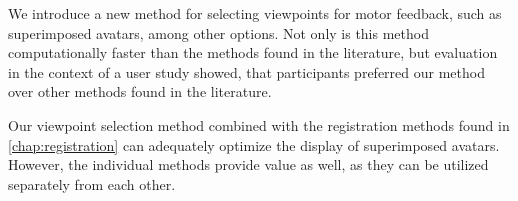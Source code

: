 We introduce a new method for selecting viewpoints for motor feedback, such as superimposed avatars, among other options. Not only is this method computationally faster than the methods found in the literature, but evaluation in the context of a user study showed, that participants preferred our method over other methods found in the literature.

Our viewpoint selection method combined with the registration methods found in \autoref{chap:registration} can adequately optimize the display of superimposed avatars. However, the individual methods provide value as well, as they can be utilized separately from each other.